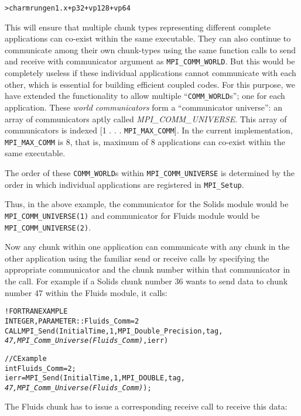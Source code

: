 \documentclass[10pt]{article}
\begin{document}
\begin{alltt}
> charmrun gen1.x +p 32 +vp 128 +vp 64
\end{alltt}

This will ensure that multiple chunk types representing different complete
applications can co-exist within the same executable. They can also continue to
communicate among their own chunk-types using the same \ampi{} function calls
to send and receive with communicator argument as \texttt{MPI\_COMM\_WORLD}.
But this would be completely useless if these individual applications cannot
communicate with each other, which is essential for building efficient coupled
codes.  For this purpose, we have extended the \ampi{} functionality to allow
multiple ``\texttt{COMM\_WORLD}s''; one for each application. These \emph{world
communicators} form a ``communicator universe'': an array of communicators
aptly called \emph{MPI\_COMM\_UNIVERSE}. This array of communicators is 
indexed [1 . . . \texttt{MPI\_MAX\_COMM}]. In the current implementation,
\texttt{MPI\_MAX\_COMM} is 8, that is, maximum of 8 applications can co-exist
within the same executable.

The order of these \texttt{COMM\_WORLD}s within \texttt{MPI\_COMM\_UNIVERSE}
is determined by the order in which individual applications are registered in
\texttt{MPI\_Setup}.

Thus, in the above example, the communicator for the Solids module would be
\texttt{MPI\_COMM\_UNIVERSE(1)} and communicator for Fluids module would be
\texttt{MPI\_COMM\_UNIVERSE(2)}.

Now any chunk within one application can communicate with any chunk in the
other application using the familiar send or receive \ampi{} calls by
specifying the appropriate communicator and the chunk number within that
communicator in the call. For example if a Solids chunk number 36 wants to send
data to chunk number 47 within the Fluids module, it calls:

\begin{alltt}
!FORTRAN EXAMPLE
INTEGER , PARAMETER :: Fluids_Comm = 2
CALL MPI_Send(InitialTime, 1, MPI_Double_Precision, tag, 
              \emph{47, MPI_Comm_Universe(Fluids_Comm)}, ierr)

//C Example
int Fluids_Comm = 2;
ierr = MPI_Send(InitialTime, 1, MPI_DOUBLE, tag,
                \emph{47, MPI_Comm_Universe(Fluids_Comm)});
\end{alltt}

The Fluids chunk has to issue a corresponding receive call to receive this
data:
\end{document}

